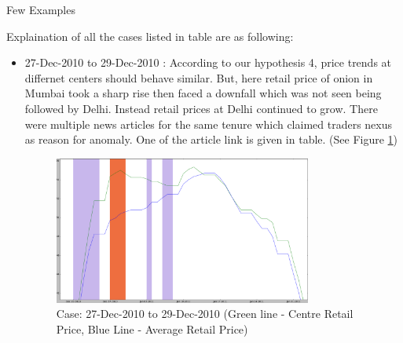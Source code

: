 \documentclass[a4paper,10pt]{article}
\begin{document}
\begin{table}[H]
\caption{Few Examples}
\label{examples}

\end{table}

Explaination of all the cases listed in table are as following:

\begin{itemize}
 \item 27-Dec-2010 to 29-Dec-2010 : According to our hypothesis 4, price trends at differnet centers should behave similar. But, here retail price of onion in Mumbai took a sharp rise then faced a downfall which was not seen being followed by Delhi. Instead retail prices at Delhi continued to grow. There were multiple news articles for the same tenure which claimed traders nexus as reason for anomaly. One of the article link is given in table. (See Figure \ref{fig:Mumbai_RetailvsAvg_ill1})
 
	\begin{figure}[H]
	\centering
	\includegraphics[width=0.8\textwidth]{graphs/Mumbai_RetailvsAvg_ill1.png}
	\caption{Case: 27-Dec-2010 to 29-Dec-2010 (Green line - Centre Retail Price, Blue Line - Average Retail Price)}
	\label{fig:Mumbai_RetailvsAvg_ill1}
	\end{figure}
  

\end{itemize}
\end{document}
